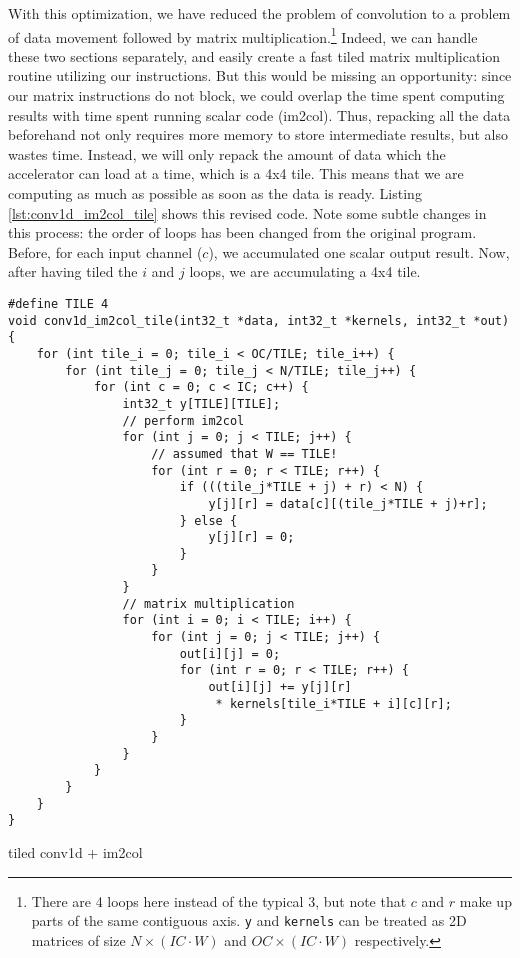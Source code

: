 \documentclass[acmsmall, nonacm=true]{acmart}
\begin{document}
With this optimization, we have reduced the problem of convolution to a problem of data movement followed by matrix multiplication.\footnote{There are 4 loops here instead of the typical 3, but note that $c$ and $r$ make up parts of the same contiguous axis. \texttt{y} and \texttt{kernels} can be treated as 2D matrices of size $N\times (IC\cdot W)$ and $OC\times (IC\cdot W)$ respectively.} Indeed, we can handle these two sections separately, and easily create a fast tiled matrix multiplication routine utilizing our instructions. But this would be missing an opportunity: since our matrix instructions do not block, we could overlap the time spent computing results with time spent running scalar code (im2col). Thus, repacking all the data beforehand not only requires more memory to store intermediate results, but also wastes time. Instead, we will only repack the amount of data which the accelerator can load at a time, which is a 4x4 tile. This means that we are computing as much as possible as soon as the data is ready. Listing \ref{lst:conv1d_im2col_tile} shows this revised code. Note some subtle changes in this process: the order of loops has been changed from the original program. Before, for each input channel ($c$), we accumulated one scalar output result. Now, after having tiled the $i$ and $j$ loops, we are accumulating a 4x4 tile.

\begin{listing}
    \centering
    \begin{verbatim}
#define TILE 4
void conv1d_im2col_tile(int32_t *data, int32_t *kernels, int32_t *out) {
    for (int tile_i = 0; tile_i < OC/TILE; tile_i++) {
        for (int tile_j = 0; tile_j < N/TILE; tile_j++) {
            for (int c = 0; c < IC; c++) {
                int32_t y[TILE][TILE];
                // perform im2col
                for (int j = 0; j < TILE; j++) {
                    // assumed that W == TILE!
                    for (int r = 0; r < TILE; r++) {
                        if (((tile_j*TILE + j) + r) < N) {
                            y[j][r] = data[c][(tile_j*TILE + j)+r];
                        } else {
                            y[j][r] = 0;
                        }                    
                    }
                }
                // matrix multiplication
                for (int i = 0; i < TILE; i++) {
                    for (int j = 0; j < TILE; j++) {
                        out[i][j] = 0;
                        for (int r = 0; r < TILE; r++) {
                            out[i][j] += y[j][r] 
                             * kernels[tile_i*TILE + i][c][r];
                        }
                    }
                }
            }
        }
    }
}
\end{verbatim}
    \caption{tiled conv1d + im2col}
    \label{lst:conv1d_im2col_tile}
\end{listing}
\end{document}
